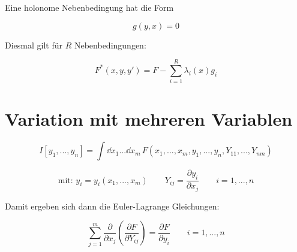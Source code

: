 \begin{framedthm}
	
	Eine holonome Nebenbedingung hat die Form
	
	\[ g(y, x) = 0 \]
	
	Diesmal gilt für $R$ Nebenbedingungen:
	
	\[ F^*(x, y, y') = F - \sum_{i=1}^R \lambda_i(x) g_i \]
	
\end{framedthm}


\section{Variation mit mehreren Variablen}


\begin{framedprop}

\[ I[y_1, ..., y_n] = \int \dd x_1 ... \dd x_m \, F(x_1,...,x_m, y_1,...,y_n, Y_{11},..., Y_{nm}) \]

\[ \textrm{mit: } y_i = y_i(x_1,..., x_m) \qquad Y_{ij} = \frac{\partial y_i}{\partial x_j} \qquad i = 1,...,n\]

Damit ergeben sich dann die Euler-Lagrange Gleichungen:

\[ \sum_{j=1}^m \frac{\partial}{\partial x_j} \left(\frac{\partial F}{\partial Y_{ij}} \right) = \frac{\partial F}{\partial y_i} \qquad i = 1,...,n \]
	
\end{framedprop}




